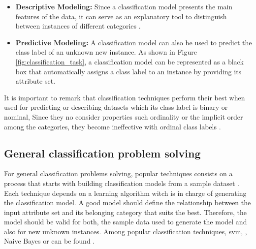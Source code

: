 \begin{itemize}
\item \textbf{Descriptive Modeling:} Since a classification model presents the main features of the data, it can serve as an explanatory tool to distinguish between instances of different categories \cite{madigan2002descriptive}.

\item \textbf{Predictive Modeling:} A classification model can also be used to predict the class label of an unknown new instance. As shown in Figure \ref{fig:classification_task}, a classification model can be represented as a black box that automatically assigns a class label to an instance by providing its attribute set.
\end{itemize}

It is important to remark that classification techniques perform their best when used for predicting or describing datasets which its class label is binary or nominal, Since they no consider properties such ordinality or the implicit order among the categories, they become ineffective with ordinal class labels \cite{frank2001simple}.

\subsection{General classification problem solving}
\label{general_classificartion_problem_solving}

For general classification problems solving, popular techniques consists on a process that starts with building classification models from a sample dataset \cite{witten2005data}. Each technique depends on a learning algorithm witch is in charge of generating the classification model. A good model should define the relationship between the input attribute set and its belonging category that suits the best. Therefore, the model should be valid for both, the sample data used to generate the model and also for new unknown instances. Among popular classification techniques, \acrfull{svm}, , Naive Bayes or  can be found \cite{garje2016sentiment}.

